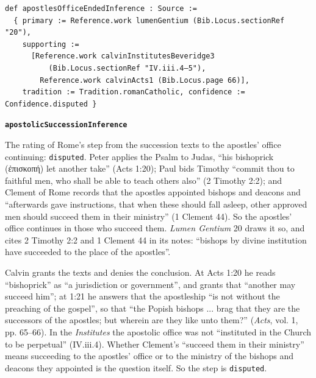 \documentclass[11pt]{article}
\begin{document}
{\small\begin{verbatim}
def apostlesOfficeEndedInference : Source :=
  { primary := Reference.work lumenGentium (Bib.Locus.sectionRef "20"),
    supporting :=
      [Reference.work calvinInstitutesBeveridge3
          (Bib.Locus.sectionRef "IV.iii.4–5"),
        Reference.work calvinActs1 (Bib.Locus.page 66)],
    tradition := Tradition.romanCatholic, confidence := Confidence.disputed }
\end{verbatim}}
\par\medskip\noindent\textbf{\texttt{apostolic\allowbreak{}Succession\allowbreak{}Inference}}\par\nobreak\noindent
The rating of Rome’s step from the succession texts to the apostles’ office continuing: \texttt{disputed}. Peter applies the Psalm to Judas, “his bishoprick (ἐπισκοπή) let another take” (Acts 1:20); Paul bids Timothy “commit thou to faithful men, who shall be able to teach others also” (2 Timothy 2:2); and Clement of Rome records that the apostles appointed bishops and deacons and “afterwards gave instructions, that when these should fall asleep, other approved men should succeed them in their ministry” (1 Clement 44). So the apostles’ office continues in those who succeed them. \emph{Lumen Gentium} 20 draws it so, and cites 2 Timothy 2:2 and 1 Clement 44 in its notes: “bishops by divine institution have succeeded to the place of the apostles”.

Calvin grants the texts and denies the conclusion. At Acts 1:20 he reads “bishoprick” as “a jurisdiction or government”, and grants that “another may succeed him”; at 1:21 he answers that the apostleship “is not without the preaching of the gospel”, so that “the Popish bishops ... brag that they are the successors of the apostles; but wherein are they like unto them?” (\emph{Acts}, vol. 1, pp. 65–66). In the \emph{Institutes} the apostolic office was not “instituted in the Church to be perpetual” (IV.iii.4). Whether Clement’s “succeed them in their ministry” means succeeding to the apostles’ office or to the ministry of the bishops and deacons they appointed is the question itself. So the step is \texttt{disputed}.
\end{document}
